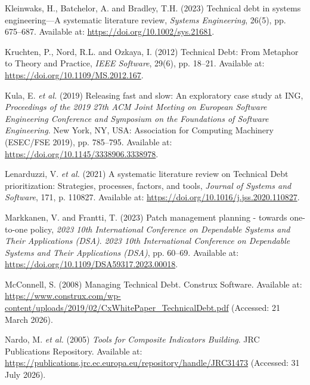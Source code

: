 \documentclass[
  12pt,
  letterpaper,
  12pt,
  oneside,
  english,
  onehalfspacing,
  headsepline]{MastersDoctoralThesis}
\newlength{\cslhangindent}
\newenvironment{CSLReferences}[2] %
 {\begin{list}{}{%
  \setlength{\itemindent}{0pt}
  \setlength{\leftmargin}{0pt}
  \setlength{\parsep}{0pt}
  \ifodd #1
   \setlength{\leftmargin}{\cslhangindent}
   \setlength{\itemindent}{-1\cslhangindent}
  \fi
  \setlength{\itemsep}{#2\baselineskip}}}
 {\end{list}}
\begin{document}
\begin{CSLReferences}{0}{1}
Kleinwaks, H., Batchelor, A. and Bradley, T.H. (2023)
\textquotesingle Technical debt in systems engineering---{A} systematic
literature review\textquotesingle, \emph{Systems Engineering}, 26(5),
pp. 675--687. Available at: \url{https://doi.org/10.1002/sys.21681}.

Kruchten, P., Nord, R.L. and Ozkaya, I. (2012)
\textquotesingle Technical {Debt}: {From Metaphor} to {Theory} and
{Practice}\textquotesingle, \emph{IEEE Software}, 29(6), pp. 18--21.
Available at: \url{https://doi.org/10.1109/MS.2012.167}.

Kula, E. \emph{et al.} (2019) \textquotesingle Releasing fast and slow:
An exploratory case study at {ING}\textquotesingle, \emph{Proceedings of
the 2019 27th {ACM Joint Meeting} on {European Software Engineering
Conference} and {Symposium} on the {Foundations} of {Software
Engineering}}. New York, NY, USA: Association for Computing Machinery
({ESEC}/{FSE} 2019), pp. 785--795. Available at:
\url{https://doi.org/10.1145/3338906.3338978}.

Lenarduzzi, V. \emph{et al.} (2021) \textquotesingle A systematic
literature review on {Technical Debt} prioritization: {Strategies},
processes, factors, and tools\textquotesingle, \emph{Journal of Systems
and Software}, 171, p. 110827. Available at:
\url{https://doi.org/10.1016/j.jss.2020.110827}.

Markkanen, V. and Frantti, T. (2023) \textquotesingle Patch management
planning - towards one-to-one policy\textquotesingle, \emph{2023 10th
{International Conference} on {Dependable Systems} and {Their
Applications} ({DSA})}. \emph{2023 10th {International Conference} on
{Dependable Systems} and {Their Applications} ({DSA})}, pp. 60--69.
Available at: \url{https://doi.org/10.1109/DSA59317.2023.00018}.

McConnell, S. (2008) \textquotesingle Managing {Technical
Debt}\textquotesingle. Construx Software. Available at:
\url{https://www.construx.com/wp-content/uploads/2019/02/CxWhitePaper_TechnicalDebt.pdf}
(Accessed: 21 March 2026).

Nardo, M. \emph{et al.} (2005) \emph{Tools for {Composite Indicators
Building}}. JRC Publications Repository. Available at:
\url{https://publications.jrc.ec.europa.eu/repository/handle/JRC31473}
(Accessed: 31 July 2026).


\end{CSLReferences}
\end{document}

